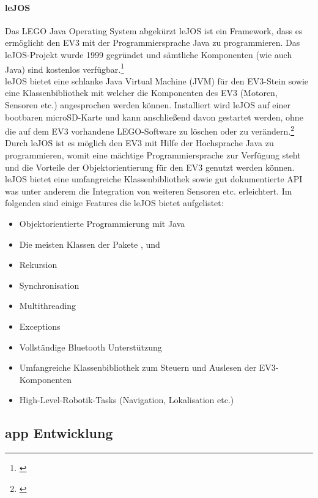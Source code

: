 \paragraph{leJOS}
Das LEGO Java Operating System abgekürzt leJOS ist ein Framework, dass es ermöglicht den EV3 mit der Programmiersprache Java zu programmieren. Das leJOS-Projekt wurde 1999 gegründet und sämtliche Komponenten (wie auch Java) sind kostenlos verfügbar.\footnote{\citep[vgl.][EV3-Programmieren mit Java, Seite 21]{Schobel.RobertaEV3Programmieren}\label{note34}} \\
leJOS bietet eine schlanke Java Virtual Machine (JVM) für den EV3-Stein sowie eine Klassenbibliothek mit welcher die Komponenten des EV3 (Motoren, Sensoren etc.) angesprochen werden können. Installiert wird leJOS auf einer bootbaren microSD-Karte und kann anschließend davon gestartet werden, ohne die auf dem EV3 vorhandene LEGO-Software zu löschen oder zu verändern.\footnote{\citep[vgl.][EV3-Programmieren mit Java, Seite 23]{Schobel.RobertaEV3Programmieren}\label{note35}} \\
Durch leJOS ist es möglich den EV3 mit Hilfe der Hochsprache Java zu programmieren, womit eine mächtige Programmiersprache zur Verfügung steht und die Vorteile der Objektorientierung für den EV3 genutzt werden können.
leJOS bietet eine umfangreiche Klassenbibliothek sowie gut dokumentierte API was unter anderem die Integration von weiteren Sensoren etc. erleichtert.
Im folgenden sind einige Features die leJOS bietet aufgelistet:
\begin{itemize}
	\item{Objektorientierte Programmierung mit Java}
	\item{Die meisten Klassen der Pakete ,  und }
	\item{Rekursion}
	\item{Synchronisation}
	\item{Multithreading}
	\item{Exceptions}
	\item{Vollständige Bluetooth Unterstützung}
	\item{Umfangreiche Klassenbibliothek zum Steuern und Auslesen der EV3-Komponenten}
	\item{High-Level-Robotik-Tasks (Navigation, Lokalisation etc.)}
\end{itemize}

\newpage
\subsection{\gls{app} Entwicklung} %

